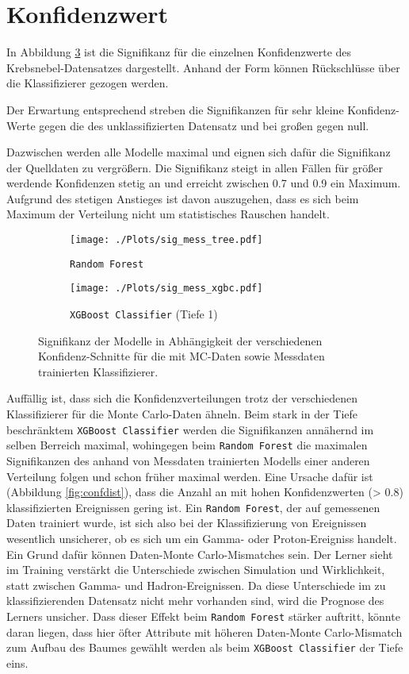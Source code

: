 \section{Konfidenzwert}
\label{sec:konf}
In Abbildung \ref{fig:signconf} ist die Signifikanz für die einzelnen Konfidenzwerte des Krebsnebel-Datensatzes dargestellt. 
Anhand der Form können Rückschlüsse über die Klassifizierer gezogen werden. 

Der Erwartung entsprechend streben die Signifikanzen für sehr kleine Konfidenz-Werte gegen die des unklassifizierten Datensatz und bei großen gegen null.

Dazwischen werden alle Modelle maximal und eignen sich dafür die Signifikanz der Quelldaten zu vergrößern.
Die Signifikanz steigt in allen Fällen für größer werdende Konfidenzen stetig an und erreicht zwischen \num{0.7} und \num{0.9} ein Maximum.
Aufgrund des stetigen Anstieges ist davon auszugehen, dass es sich beim Maximum der Verteilung nicht um statistisches Rauschen handelt.
\begin{figure}[H]
  \centering
  \begin{subfigure}[b]{0.48\textwidth}
  \centering
  \texttt{[image: ./Plots/sig\_mess\_tree.pdf]}
  \caption{\texttt{Random Forest}}
  \label{fig:signconfMC}
\end{subfigure}
\begin{subfigure}[b]{0.48\textwidth}
  \centering
  \texttt{[image: ./Plots/sig\_mess\_xgbc.pdf]}
  \caption{\texttt{XGBoost Classifier} (Tiefe 1)}
  \label{fig:signconfMESS}
\end{subfigure}
\caption{Signifikanz der Modelle in Abhängigkeit der verschiedenen Konfidenz-Schnitte für die mit MC-Daten sowie Messdaten trainierten Klassifizierer.}
\label{fig:signconf}
\end{figure}
Auffällig ist, dass sich die Konfidenzverteilungen trotz der verschiedenen Klassifizierer für die Monte Carlo-Daten ähneln.
Beim stark in der Tiefe beschränktem \texttt{XGBoost Classifier} werden die Signifikanzen annähernd im selben Berreich maximal, wohingegen beim \texttt{Random Forest} die maximalen Signifikanzen des anhand von Messdaten trainierten Modells einer anderen Verteilung folgen und schon früher maximal werden. 
Eine Ursache dafür ist (Abbildung \ref{fig:confdist}), dass die Anzahl an mit hohen Konfidenzwerten (\num{> 0.8}) klassifizierten Ereignissen gering ist. 
Ein \texttt{Random Forest}, der auf gemessenen Daten trainiert wurde, ist sich also bei der Klassifizierung von Ereignissen wesentlich unsicherer, ob es sich um ein Gamma- oder Proton-Ereigniss handelt.
Ein Grund dafür können Daten-Monte Carlo-Mismatches sein. 
Der Lerner sieht im Training verstärkt die Unterschiede zwischen Simulation und Wirklichkeit, statt zwischen Gamma- und Hadron-Ereignissen.
Da diese Unterschiede im zu klassifizierenden Datensatz nicht mehr vorhanden sind, wird die Prognose des Lerners unsicher.
Dass dieser Effekt beim \texttt{Random Forest} stärker auftritt, könnte daran liegen, dass hier öfter Attribute mit höheren Daten-Monte Carlo-Mismatch zum Aufbau des Baumes gewählt werden als beim \texttt{XGBoost Classifier} der Tiefe eins.
\newpage
